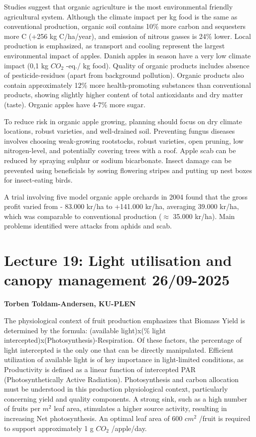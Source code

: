 \vspace{0.5em}
Studies suggest that organic agriculture is the most environmental friendly agricultural system. Although the climate impact per kg food is the same as conventional production, organic soil contains 10\% more carbon and sequesters more C (+256 kg C/ha/year), and emission of nitrous gasses is 24\% lower. Local production is emphasized, as transport and cooling represent the largest environmental impact of apples. Danish apples in season have a very low climate impact (0,1 kg $CO_2$ -eq./ kg food). Quality of organic products includes absence of pesticide-residues (apart from background pollution). Organic products also contain approximately 12\% more health-promoting substances than conventional products, showing slightly higher content of total antioxidants and dry matter (taste). Organic apples have 4-7\% more sugar.

\vspace{0.5em}
To reduce risk in organic apple growing, planning should focus on dry climate locations, robust varieties, and well-drained soil. Preventing fungus diseases involves choosing weak-growing rootstocks, robust varieties, open pruning, low nitrogen-level, and potentially covering trees with a roof. Apple scab can be reduced by spraying sulphur or sodium bicarbonate. Insect damage can be prevented using beneficials by sowing flowering stripes and putting up nest boxes for insect-eating birds.

\vspace{0.5em}
A trial involving five model organic apple orchards in 2004 found that the gross profit varied from - 83.000 kr/ha to +141.000 kr/ha, averaging 39.000 kr/ha, which was comparable to conventional production ($\approx$ 35.000 kr/ha). Main problems identified were attacks from aphids and scab.


\section{Lecture 19: Light utilisation and canopy management 26/09-2025}
\textbf{Torben Toldam-Andersen, KU-PLEN}

\vspace{1em}
The physiological context of fruit production emphasizes that Biomass Yield is determined by the formula: (available light)x(\% light intercepted)x(Photosynthesis)-Respiration. Of these factors, the percentage of light intercepted is the only one that can be directly manipulated. Efficient utilization of available light is of key importance in light-limited conditions, as Productivity is defined as a linear function of intercepted PAR (Photosynthetically Active Radiation). Photosynthesis and carbon allocation must be understood in this production physiological context, particularly concerning yield and quality components. A strong sink, such as a high number of fruits per $m^2$ leaf area, stimulates a higher source activity, resulting in increasing Net photosynthesis. An optimal leaf area of 600 $cm^2$ /fruit is required to support approximately 1 g $CO_2$ /apple/day.


